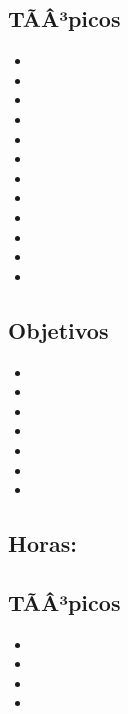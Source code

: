 \subsection*{TÃÂ³picos}
\begin{itemize}
	\item \ALTRESTopicAlgoritmos
	\item \ALTRESTopicBusqueda
	\item \ALTRESTopicAlgoritmoscuadraticos
	\item \ALTRESTopicAlgoritmosde
	\item \ALTRESTopicTablas
	\item \ALTRESTopicArboles
	\item \ALTRESTopicRepresentacion
	\item \ALTRESTopicRecorridos
	\item \ALTRESTopicEl
	\item \ALTRESTopicCerradura
	\item \ALTRESTopicArbol
	\item \ALTRESTopicOrdenamiento
\end{itemize}

\subsection*{Objetivos}
\begin{itemize}
	\item \ALTRESObjUNO
	\item \ALTRESObjDOS
	\item \ALTRESObjTRES
	\item \ALTRESObjCUATRO
	\item \ALTRESObjCINCO
	\item \ALTRESObjSEIS
	\item \ALTRESObjSIETE
\end{itemize}

\subsection{\ALCUATRODef}\label{sec:BOK-AL4}
\subsection*{Horas: \ALCUATROHours}

\subsection*{TÃÂ³picos}
\begin{itemize}
	\item \ALCUATROTopicConsenso
	\item \ALCUATROTopicDeteccion
	\item \ALCUATROTopicTolerancia
	\item \ALCUATROTopicEstabilizacion
\end{itemize}

